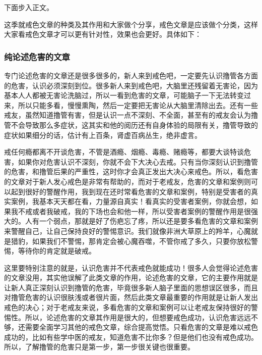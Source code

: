 \documentclass{ctexart}
\begin{document}
下面步入正文。

这季就戒色文章的种类及其作用和大家做个分享，戒色文章是应该做个分类，这样大家看戒色文章才可以更有针对性，效果也会更好。具体如下：

\subsubsection{纯论述危害的文章}

专门论述危害的文章还是很多很多的，新人来到戒色吧，一定要先认识撸管各方面的危害，认识必须深刻到位。很多新人来到戒色吧，大脑里还残留着无害论，因为基本人人都被无害论洗脑过，所以一看到危害的文章，可能脑子一下无法转变过来，所以只能多看，慢慢熏陶，然后一定要把无害论从大脑里清除出去。还有一些戒友，虽然知道撸管有害，但是认识一点不深刻、不全面，甚至有的戒友会认为撸管不会导致那么多症状，这其实和他的阅历还有自身体验的局限有关，撸管导致的症状如果细分的话，估计有上百条，肾虚百病丛生，绝非虚言。

戒任何瘾都离不开谈危害，不管是酒瘾、烟瘾、毒瘾、赌瘾等，都要大谈特谈危害，如果你对危害认识不深刻，你就不会下大决心去戒。只有当你深刻认识到撸管的危害，和撸管后果的严重性，这时你才会真正发出大决心来戒色。所以，看危害的文章对于新人发心戒色是非常有帮助的，而对于老戒友，危害的文章和案例则可以起到很好的警醒作用，我到现在还时常看危害的文章和案例，特别是受害者的真实案例，我基本天天都在看，力量源自真实！看真实的受害者案例，你就会想，如果我不戒或者我破戒，我的下场也会和他一样，所以受害者案例的警醒作用是很强大的。人有一个弱点，那就是好了伤疤忘了疼，所以还是要多看危害的文章和案例来警醒自己，让自己保持良好的警惕意识。我们就像非洲大草原上的羚羊，心魔就是猎豹，如果我们不警惕，那肯定会被心魔吞噬，不管你戒了多久，只要你放松警惕，等待你的肯定就是破戒。

这里要特别注意的就是，认识危害并不代表戒色就能成功！很多人会觉得论述危害的文章没用，其实他误解了此类文章的作用，论述危害的文章，它的主要作用就是让新人真正深刻认识到撸管的危害，毕竟很多新人脑子里面的思想误区很多，而且对撸管危害的认识很肤浅或者很片面，然后此类文章最重要的作用就是让新人发出戒色的决心；对于老戒友来说，多看危害的文章和案例可以让老戒友保持很好的警惕性。所以，论述危害的文章其作用是很大的，但想要戒色成功，认识危害远远不够，还需要全面学习其他的戒色文章，综合提高觉悟。只看危害的文章是难以戒色成功的，比如有些学中医的戒友，知道危害不比你多？但是他们也没有戒色成功。所以，了解撸管的危害只是第一步，第一步很关键也很重要。
\end{document}
